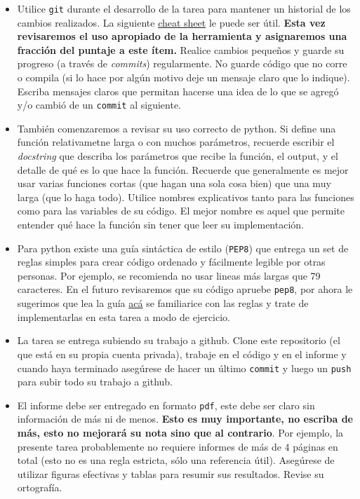 \documentclass[letter, 11pt]{article}
\begin{document}
\vspace{1em}
\begin{itemize}

  \item Utilice \texttt{git} durante el desarrollo de la tarea para mantener un
    historial de los cambios realizados. La siguiente
    \href{https://education.github.com/git-cheat-sheet-education.pdf}{cheat
      sheet} le puede ser útil. {\bf Esta vez revisaremos el uso apropiado de
    la herramienta y asignaremos una fracción del puntaje a este ítem.} Realice
    cambios pequeños y guarde su progreso (a través de \emph{commits})
    regularmente. No guarde código que no corre o compila (si lo hace por algún
    motivo deje un mensaje claro que lo indique). Escriba mensajes claros que
    permitan hacerse una idea de lo que se agregó y/o cambió de un
    \texttt{commit} al siguiente.

  \item También comenzaremos a revisar su uso correcto de python. Si define una
    función relativametne larga o con muchos parámetros, recuerde escribir el
    \emph{docstring} que describa los parámetros que recibe la función, el
    output, y el detalle de qué es lo que hace la función. Recuerde que
    generalmente es mejor usar varias funciones cortas (que hagan una sola cosa
    bien) que una muy larga (que lo haga todo).  Utilice nombres explicativos
    tanto para las funciones como para las variables de su código. El mejor
    nombre es aquel que permite entender qué hace la función sin tener que leer
    su implementación.

  \item Para python existe una guía sintáctica de estilo (\texttt{PEP8}) que
    entrega un set de reglas simples para crear código ordenado y fácilmente
    legible por otras personas. Por ejemplo, se recomienda no usar lineas más
    largas que 79 caracteres. En el futuro revisaremos que su código apruebe
    \texttt{pep8}, por ahora le sugerimos que lea la guía
    \href{https://www.python.org/dev/peps/pep-0008/}{acá} se familiarice con
    las reglas y trate de implementarlas en esta tarea a modo de ejercicio.

  \item La tarea se entrega subiendo su trabajo a github. Clone este
    repositorio (el que está en su propia cuenta privada), trabaje en el código
    y en el informe y cuando haya terminado asegúrese de hacer un último
    \texttt{commit} y luego un \texttt{push} para subir todo su trabajo a
    github.

  \item El informe debe ser entregado en formato \texttt{pdf}, este debe ser
    claro sin información de más ni de menos. \textbf{Esto es muy importante,
    no escriba de más, esto no mejorará su nota sino que al contrario}. Por
    ejemplo, la presente tarea probablemente no requiere informes de más de 4
    páginas en total (esto no es una regla estricta, sólo una referencia útil).
    Asegúrese de utilizar figuras efectivas y tablas para resumir sus
    resultados. Revise su ortografía.

\end{itemize}

\end{document}
